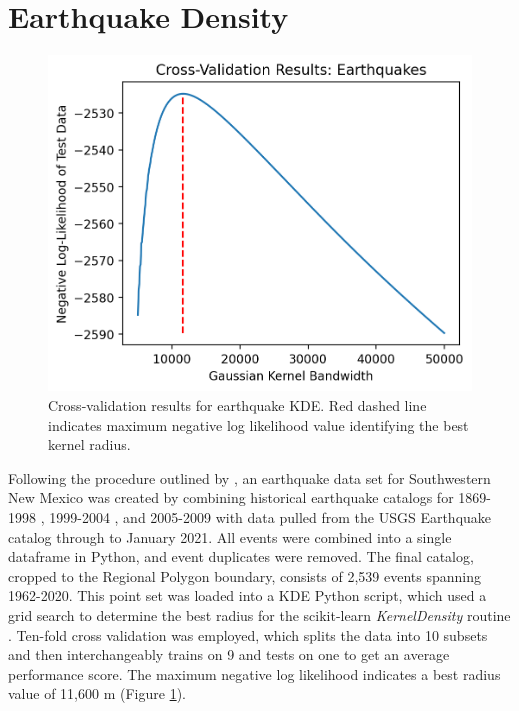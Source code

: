 \section{Earthquake Density}\label{app:dl_eq_density}
\begin{figure}
\centering
\includegraphics[scale=0.6]{templates/images/Figure-Earthquakes_kde_gridsearchcv_result.png}
\singlespacing
\caption[Earthquake density parameter tuning]{Cross-validation results for earthquake KDE. Red dashed line indicates maximum negative log likelihood value identifying the best kernel radius.}
\label{fig:EQ_cv}
\end{figure}
Following the procedure outlined by \citet{pepin_new_2018}, an earthquake data set for Southwestern New Mexico was created by combining historical earthquake catalogs for 1869-1998 \citep{sanford_earthquake_2002}, 1999-2004 \citep{sanford_earthquake_2006}, and 2005-2009 \citep{pursley_earthquake_2013} with data pulled from the USGS Earthquake catalog \citep{usgs_earthquake_2021} through to January 2021. All events were combined into a single dataframe in Python, and event duplicates were removed. The final catalog, cropped to the Regional Polygon boundary, consists of 2,539 events spanning 1962-2020. This point set was loaded into a KDE Python script, which used a grid search to determine the best radius for the scikit-learn \textit{KernelDensity} routine \citep{pedregosa_scikit-learn_2011}. Ten-fold cross validation was employed, which splits the data into 10 subsets and then interchangeably trains on 9 and tests on one to get an average performance score. The maximum negative log likelihood indicates a best radius value of 11,600 m (Figure \ref{fig:EQ_cv}). 

